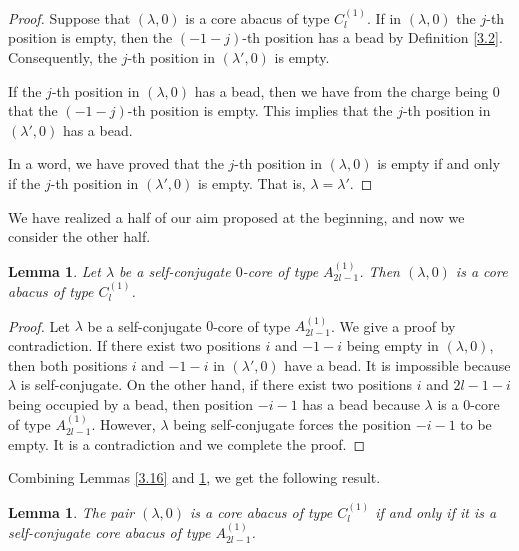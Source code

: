 \documentclass[11pt]{amsart}
\theoremstyle{plain}
\numberwithin{equation}{subsection}
\newtheorem{lemma}[theorem]{Lemma}
\newcommand{\lam}{\lambda}
\begin{document}
\begin{proof}
Suppose that $(\lambda, 0)$ is a core abacus of type $C_l^{(1)}$. If in $(\lambda, 0)$ the $j$-th position is empty, 
then the $(-1-j)$-th position has a bead by Definition \ref{3.2}. Consequently, the $j$-th position in $(\lambda', 0)$ is empty.
	
If the $j$-th position in $(\lambda, 0)$ has a bead, then we have from the charge being 0 that the $(-1-j)$-th position is empty. 
This implies that the $j$-th position in $(\lambda', 0)$ has a bead.
	
In a word, we have proved that the $j$-th position in $(\lambda, 0)$ is empty if and only if the $j$-th position in $(\lambda', 0)$ is empty. That is, $\lambda = \lambda'$.
\end{proof}

We have realized a half of our aim proposed at the beginning, and now we consider the other half.

\begin{lemma}\label{3.17}
Let $\lam$ be a self-conjugate $0$-core of type $A_{2l-1}^{(1)}$. Then $(\lam, 0)$ is a core abacus of type $C_l^{(1)}$.
\end{lemma}

\begin{proof}
Let $\lam$ be a self-conjugate $0$-core of type $A_{2l-1}^{(1)}$. We give a proof by contradiction. 
If there exist two positions $i$ and $-1-i$ being empty in $(\lam, 0)$, then both positions $i$ and $-1-i$ in $(\lam', 0)$ have a bead.
It is impossible because $\lam$ is self-conjugate. On the other hand,  if there exist two positions $i$ and $2l-1-i$ being occupied by a bead, 
then position $-i-1$ has a bead because $\lam$ is a $0$-core of type $A_{2l-1}^{(1)}$. However, $\lam$ being self-conjugate forces 
the position $-i-1$ to be empty. It is a contradiction and we complete the proof.
\end{proof}

Combining Lemmas \ref{3.16} and \ref{3.17}, we get the following result.

\begin{lemma}\label{3.18}
The pair $(\lam, 0)$ is a core abacus of type $C_l^{(1)}$ if and only if it is a self-conjugate core abacus of type $A_{2l-1}^{(1)}$.
\end{lemma}
\end{document}
